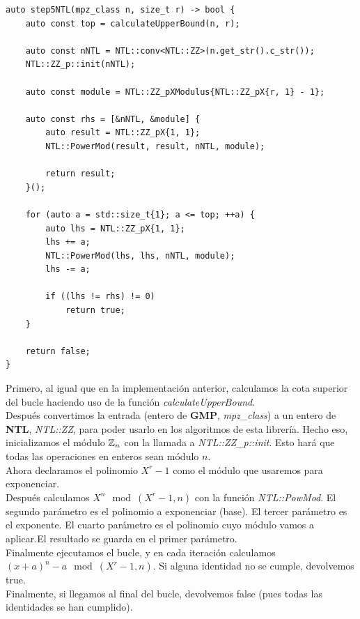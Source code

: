 \begin{lstlisting}
auto step5NTL(mpz_class n, size_t r) -> bool {
	auto const top = calculateUpperBound(n, r);
	
	auto const nNTL = NTL::conv<NTL::ZZ>(n.get_str().c_str());
	NTL::ZZ_p::init(nNTL);
	
	auto const module = NTL::ZZ_pXModulus{NTL::ZZ_pX{r, 1} - 1};
	
	auto const rhs = [&nNTL, &module] {
		auto result = NTL::ZZ_pX{1, 1};
		NTL::PowerMod(result, result, nNTL, module);
		
		return result;
	}();
	
	for (auto a = std::size_t{1}; a <= top; ++a) {
		auto lhs = NTL::ZZ_pX{1, 1};
		lhs += a;
		NTL::PowerMod(lhs, lhs, nNTL, module);
		lhs -= a;
		
		if ((lhs != rhs) != 0)
			return true;
	}
	
	return false;
}
\end{lstlisting}

Primero, al igual que en la implementación anterior, calculamos la cota superior del bucle haciendo uso de la función \textit{calculateUpperBound}.\\

Después convertimos la entrada (entero de \textbf{GMP}, \textit{mpz\_class}) a un entero de \textbf{NTL}, \textit{NTL::ZZ}, para poder usarlo en los algoritmos de esta librería. Hecho eso, inicializamos el módulo $\mathbb{Z}_n$ con la llamada a \textit{NTL::ZZ\_p::init}. Esto hará que todas las operaciones en enteros sean módulo $n$.\\

Ahora declaramos el polinomio $X^r - 1$ como el módulo que usaremos para exponenciar.\\

Después calculamos $X^n \mod(X^r-1, n)$ con la función \textit{NTL::PowMod}. El segundo parámetro es el polinomio a exponenciar (base). El tercer parámetro es el exponente. El cuarto parámetro es el polinomio cuyo módulo vamos a aplicar.El resultado se guarda en el primer parámetro.\\

Finalmente ejecutamos el bucle, y en cada iteración calculamos $(x + a)^n - a \mod(X^r-1, n)$. Si alguna identidad no se cumple, devolvemos true.\\

Finalmente, si llegamos al final del bucle, devolvemos false (pues todas las identidades se han cumplido).\\

